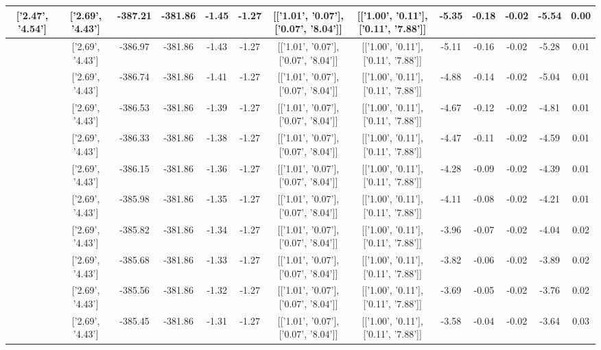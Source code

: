 \begin{table}[htbp]
\begin{adjustbox}{angle=90}
\begin{tabular}{|c|c|c|c|c|c|c|c|c|c|c|c|c|}
 ['2.47', '4.54'] & ['2.69', '4.43'] & -387.21 & -381.86 & -1.45 & -1.27 & [['1.01', '0.07'], ['0.07', '8.04']] & [['1.00', '0.11'], ['0.11', '7.88']] & -5.35 & -0.18 & -0.02 & -5.54 & 0.00\\ \hline
 ['2.49', '4.53'] & ['2.69', '4.43'] & -386.97 & -381.86 & -1.43 & -1.27 & [['1.01', '0.07'], ['0.07', '8.04']] & [['1.00', '0.11'], ['0.11', '7.88']] & -5.11 & -0.16 & -0.02 & -5.28 & 0.01\\ \hline
 ['2.50', '4.53'] & ['2.69', '4.43'] & -386.74 & -381.86 & -1.41 & -1.27 & [['1.01', '0.07'], ['0.07', '8.04']] & [['1.00', '0.11'], ['0.11', '7.88']] & -4.88 & -0.14 & -0.02 & -5.04 & 0.01\\ \hline
 ['2.51', '4.52'] & ['2.69', '4.43'] & -386.53 & -381.86 & -1.39 & -1.27 & [['1.01', '0.07'], ['0.07', '8.04']] & [['1.00', '0.11'], ['0.11', '7.88']] & -4.67 & -0.12 & -0.02 & -4.81 & 0.01\\ \hline
 ['2.53', '4.52'] & ['2.69', '4.43'] & -386.33 & -381.86 & -1.38 & -1.27 & [['1.01', '0.07'], ['0.07', '8.04']] & [['1.00', '0.11'], ['0.11', '7.88']] & -4.47 & -0.11 & -0.02 & -4.59 & 0.01\\ \hline
 ['2.54', '4.51'] & ['2.69', '4.43'] & -386.15 & -381.86 & -1.36 & -1.27 & [['1.01', '0.07'], ['0.07', '8.04']] & [['1.00', '0.11'], ['0.11', '7.88']] & -4.28 & -0.09 & -0.02 & -4.39 & 0.01\\ \hline
 ['2.55', '4.50'] & ['2.69', '4.43'] & -385.98 & -381.86 & -1.35 & -1.27 & [['1.01', '0.07'], ['0.07', '8.04']] & [['1.00', '0.11'], ['0.11', '7.88']] & -4.11 & -0.08 & -0.02 & -4.21 & 0.01\\ \hline
 ['2.56', '4.50'] & ['2.69', '4.43'] & -385.82 & -381.86 & -1.34 & -1.27 & [['1.01', '0.07'], ['0.07', '8.04']] & [['1.00', '0.11'], ['0.11', '7.88']] & -3.96 & -0.07 & -0.02 & -4.04 & 0.02\\ \hline
 ['2.58', '4.49'] & ['2.69', '4.43'] & -385.68 & -381.86 & -1.33 & -1.27 & [['1.01', '0.07'], ['0.07', '8.04']] & [['1.00', '0.11'], ['0.11', '7.88']] & -3.82 & -0.06 & -0.02 & -3.89 & 0.02\\ \hline
 ['2.59', '4.48'] & ['2.69', '4.43'] & -385.56 & -381.86 & -1.32 & -1.27 & [['1.01', '0.07'], ['0.07', '8.04']] & [['1.00', '0.11'], ['0.11', '7.88']] & -3.69 & -0.05 & -0.02 & -3.76 & 0.02\\ \hline
 ['2.60', '4.48'] & ['2.69', '4.43'] & -385.45 & -381.86 & -1.31 & -1.27 & [['1.01', '0.07'], ['0.07', '8.04']] & [['1.00', '0.11'], ['0.11', '7.88']] & -3.58 & -0.04 & -0.02 & -3.64 & 0.03\\ \hline

\end{tabular}
\end{adjustbox}
\end{table}
